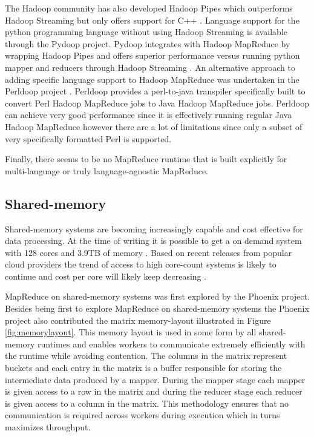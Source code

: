 \documentclass[twocolumn,11px]{article}       %
\begin{document}
The Hadoop community has also developed Hadoop Pipes which outperforms Hadoop
Streaming but only offers support for C++ \cite{HadoopPipes}. Language support
for the python programming language without using Hadoop Streaming is available
through the Pydoop project. Pydoop integrates with Hadoop MapReduce by wrapping
Hadoop Pipes and offers superior performance versus running python mapper and
reducers through Hadoop Streaming \cite{Pydoop}. An alternative approach to
adding specific language support to Hadoop MapReduce was undertaken in the
Perldoop project \cite{Perldoop}. Perldoop provides a perl-to-java transpiler
specifically built to convert Perl Hadoop MapReduce jobs to Java Hadoop
MapReduce jobs. Perldoop can achieve very good performance since it is
effectively running regular Java Hadoop MapReduce however there are a lot of
limitations since only a subset of very specifically formatted Perl is
supported.

Finally, there seems to be no MapReduce runtime that is built explicitly for
multi-language or truly language-agnostic MapReduce.



\subsection{Shared-memory}

Shared-memory systems are becoming increasingly capable and cost effective for
data processing. At the time of writing it is possible to get a on demand system
with 128 cores and 3.9TB of memory \cite{AWS}. Based on
recent releases from popular cloud providers the trend of access to high
core-count systems is likely to continue and cost per core will likely keep
decreasing \cite{AWS} \cite{GoogleCloud}.

MapReduce on shared-memory systems was first explored by the Phoenix
\cite{Phoenix} project. Besides being first to explore MapReduce on
shared-memory systems the Phoenix project also contributed the matrix
memory-layout illustrated in Figure \ref{fig:memorylayout}. This memory layout
is used in some form by all shared-memory runtimes \cite{Phoenix}
\cite{Phoenix++} \cite{CilkMR} \cite{Metis} \cite{Ostrich} and enables workers
to communicate extremely efficiently with the runtime while avoiding contention.
The columns in the matrix represent buckets and each entry in the matrix is a
buffer responsible for storing the intermediate data produced by a mapper.
During the mapper stage each mapper is given access to a row in the matrix and
during the reducer stage each reducer is given access to a column in the matrix.
This methodology ensures that no communication is required across workers during
execution which in turns maximizes throughput.
\end{document}
